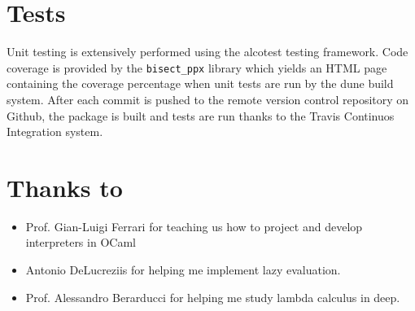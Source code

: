 \documentclass[a4paper, 11pt]{article}
\begin{document}
\begin{multicols}{2}
\section{Tests}
Unit testing is extensively performed using the alcotest testing framework. Code
coverage is provided by the \texttt{bisect\_ppx} library which yields an HTML
page containing the coverage percentage when unit tests are run by the dune
build system. After each commit is pushed to the remote version control repository on
Github, the package is built and tests are run thanks to the Travis Continuos
Integration system.

\section{Thanks to}

\begin{itemize}
	\item Prof. Gian-Luigi Ferrari for teaching us how to project and develop
	interpreters in OCaml
	\item Antonio DeLucreziis for helping me implement lazy evaluation.
	\item Prof. Alessandro Berarducci for helping me study lambda calculus in deep.
\end{itemize}

\end{multicols}
\end{document}
